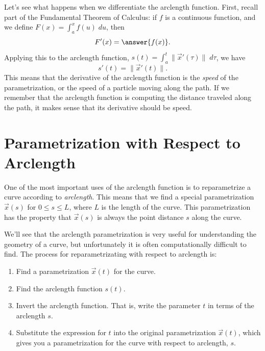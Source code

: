 \documentclass{ximera}
\begin{document}
Let's see what happens when we differentiate the arclength function. First, recall part of the Fundamental Theorem of Calculus: if $f$ is a continuous function, and we define $F(x) = \int_a^x f(u)\;du$, then
\[
F'(x) = \answer{f(x)}.
\]
Applying this to the arclength function, $s(t) = \int_a^t \|\vec{x}'(\tau)\|\;d\tau$, we have
\[
s'(t) = \|\vec{x}'(t)\|.
\]
This means that the derivative of the arclength function is the \emph{speed} of the parametrization, or the speed of a particle moving along the path. If we remember that the arclength function is computing the distance traveled along the path, it makes sense that its derivative should be speed.


\section*{Parametrization with Respect to Arclength}

One of the most important uses of the arclength function is to reparametrize a curve according to \emph{arclength}. This means that we find a special parametrization $\vec{x}(s)$ for $0\leq s\leq L$, where $L$ is the length of the curve. This parametrization has the property that $\vec{x}(s)$ is always the point distance $s$ along the curve.

\begin{image}
\end{image}

We'll see that the arclength parametrization is very useful for understanding the geometry of a curve, but unfortunately it is often computationally difficult to find. The process for reparametrizating with respect to arclength is:
\begin{enumerate}
\item Find a parametrization $\vec{x}(t)$ for the curve.
\item Find the arclength function $s(t)$.
\item Invert the arclength function. That is, write the parameter $t$ in terms of the arclength $s$.
\item Substitute the expression for $t$ into the original parametrization $\vec{x}(t)$, which gives you a parametrization for the curve with respect to arclength, $s$.
\end{enumerate}
\end{document}
